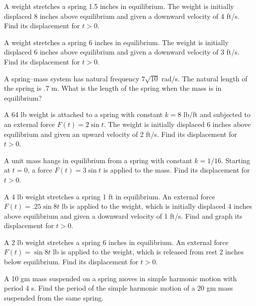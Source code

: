 \begin{exerciselist}
  \item\label{exer:6.1.7} A weight stretches a spring 1.5 inches in equilibrium. The weight is
        initially displaced 8 inches above equilibrium and given a downward velocity of 4 ft/s. Find
        its displacement for $t>0$.

  \item\label{exer:6.1.8} A weight stretches a spring 6 inches in equilibrium. The weight is
        initially displaced 6 inches above equilibrium and given a downward velocity of 3 ft/s. Find
        its displacement for $t>0$.

  \item\label{exer:6.1.9} A spring--mass system has natural frequency $7\sqrt{10}$ rad/s. The
        natural length of the spring is .7 m. What is the length of the spring when the mass is in
        equilibrium?

  \item\label{exer:6.1.10} A 64 lb weight is attached to a spring with constant $k=8$ lb/ft and
        subjected to an external force $F(t)=2\sin t$. The weight is initially displaced 6 inches
        above equilibrium and given an upward velocity of 2 ft/s. Find its displacement for $t>0$.

  \item\label{exer:6.1.11} A unit mass hangs in equilibrium from a spring with constant $k=1/16$.
        Starting at $t=0$, a force $F(t)=3\sin t$ is applied to the mass. Find its displacement for
        $t>0$.

  \item\label{exer:6.1.12} \CGex A 4 lb weight stretches a spring 1 ft in equilibrium. An external
        force $F(t)=.25\sin8t$ lb is applied to the weight, which is initially displaced 4 inches
        above equilibrium and given a downward velocity of 1 ft/s. Find and graph its displacement
        for $t>0$.

  \item\label{exer:6.1.13} A 2 lb weight stretches a spring 6 inches in equilibrium. An external
        force $F(t)=\sin8t$ lb is applied to the weight, which is released from rest 2 inches below
        equilibrium. Find its displacement for $t>0$.

  \item\label{exer:6.1.14} A 10 gm mass suspended on a spring moves in simple harmonic motion with
        period 4 s. Find the period of the simple harmonic motion of a 20 gm mass suspended from the
        same spring.


\end{exerciselist}
